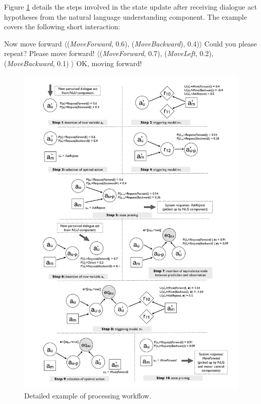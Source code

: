 Figure \ref{fig:detailedexample} details the steps involved in the state update after receiving dialogue act hypotheses from the natural language understanding component. The example covers the following short interaction: 
\begin{dialogue} 
 Now move forward 
 $\langle $(\textit{MoveForward}, 0.6), (\textit{MoveBackward}), 0.4)$\rangle$
 Could you please repeat?
 Please move forward!
 $\langle $(\textit{MoveForward}, 0.7), (\textit{MoveLeft}, 0.2), (\textit{MoveBackward}, 0.1) $\rangle$
 OK, moving forward!
\end{dialogue}


\begin{figure}[p]
\centering
\includegraphics[scale=0.25]{imgs/detailedexample.pdf}
\caption{Detailed example of processing workflow. }
\label{fig:detailedexample}
\end{figure}
 
